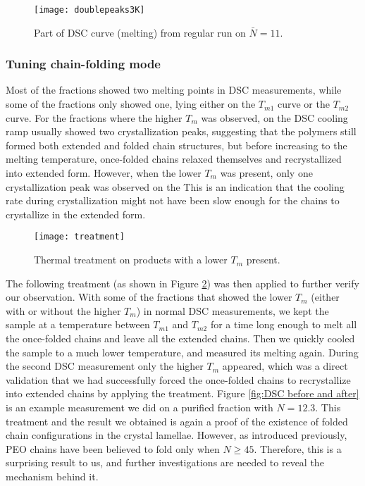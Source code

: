\begin{figure}[H]
	\center
	\texttt{[image: doublepeaks3K]}
	\caption{Part of DSC curve (melting) from regular run on $\bar{N} = 11$.}
	\label{fig:3K difference}
\end{figure}

\subsubsection{Tuning chain-folding mode}

Most of the fractions showed two melting points in DSC measurements, while some of the fractions only showed one, lying either on the $T_{m1}$ curve or the $T_{m2}$ curve. For the fractions where the higher $T_{m}$ was observed, on the DSC cooling ramp usually showed two crystallization peaks, suggesting that the polymers still formed both extended and folded chain structures, but before increasing to the melting temperature, once-folded chains relaxed themselves and recrystallized into extended form. However, when the lower $T_{m}$ was present, only one crystallization peak was observed on the This is an indication that the cooling rate during crystallization might not have been slow enough for the chains to crystallize in the extended form.

\begin{figure}[H]
	\center
	\texttt{[image: treatment]}
	\caption{Thermal treatment on products with a lower $T_{m}$ present.}
	\label{fig:treatment}
\end{figure}

The following treatment (as shown in Figure \ref{fig:treatment}) was then applied to further verify our observation. With some of the fractions that showed the lower $T_{m}$ (either with or without the higher $T_{m}$) in normal DSC measurements, we kept the sample at a temperature between $T_{m1}$ and $T_{m2}$ for a time long enough to melt all the once-folded chains and leave all the extended chains. Then we quickly cooled the sample to a much lower temperature, and measured its melting again. During the second DSC measurement only the higher $T_{m}$ appeared, which was a direct validation that we had successfully forced the once-folded chains to recrystallize into extended chains by applying the treatment. Figure \ref{fig:DSC before and after} is an example measurement we did on a purified fraction with $N = 12.3$. This treatment and the result we obtained is again a proof of the existence of folded chain configurations in the crystal lamellae. However, as introduced previously, PEO chains have been believed to fold only when $N \geq 45$. Therefore, this is a surprising result to us, and further investigations are needed to reveal the mechanism behind it.

